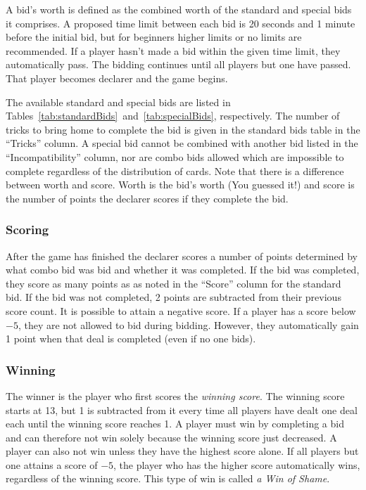 \documentclass[a4paper]{article}
\begin{document}
				A bid's worth is defined as the combined worth of the standard and special bids it comprises. A proposed time limit between each bid is 20 seconds and 1 minute before the initial bid, but for beginners higher limits or no limits are recommended. If a player hasn't made a bid within the given time limit, they automatically pass. The bidding continues until all players but one have passed. That player becomes declarer and the game begins.

				The available standard and special bids are listed in Tables~\ref{tab:standardBids}~and~\ref{tab:specialBids}, respectively. The number of tricks to bring home to complete the bid is given in the standard bids table in the ``Tricks'' column. A special bid cannot be combined with another bid listed in the ``Incompatibility'' column, nor are combo bids allowed which are impossible to complete regardless of the distribution of cards. Note that there is a difference between worth and score. Worth is the bid's worth (You guessed it!) and score is the number of points the declarer scores if they complete the bid.
			

			\subsubsection{Scoring}
				After the game has finished the declarer scores a number of points determined by what combo bid was bid and whether it was completed. If the bid was completed, they score as many points as as noted in the ``Score'' column for the standard bid. If the bid was not completed, 2 points are subtracted from their previous score count. It is possible to attain a negative score. If a player has a score below $-5$, they are not allowed to bid during bidding. However, they automatically gain 1 point when that deal is completed (even if no one bids).

			\subsubsection{Winning}
				The winner is the player who first scores the \emph{winning score}. The winning score starts at 13, but 1 is subtracted from it every time all players have dealt one deal each until the winning score reaches 1. A player must win by completing a bid and can therefore not win solely because the winning score just decreased. A player can also not win unless they have the highest score alone. If all players but one attains a score of $-5$, the player who has the higher score automatically wins, regardless of the winning score. This type of win is called \emph{a Win of Shame}.
\end{document}
